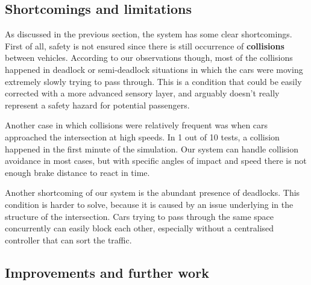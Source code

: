 \iffalse
\begin{itemize}
\item Discuss experimental results. ~
\item Shortcomings of model.
\item Improvements for further tests.
\item traffic fairness - distribution
\end{itemize}
\fi

\subsection{Shortcomings and limitations}
 
As discussed in the previous section, the system has some clear shortcomings.
First of all, safety is not ensured since there is still occurrence of \textbf{collisions} between vehicles.
According to our observations though, most of the collisions happened in deadlock or semi-deadlock situations in which the cars were moving extremely slowly trying to pass through.
This is a condition that could be easily corrected with a more advanced sensory layer, and arguably doesn't really represent a safety hazard for potential passengers.

Another case in which collisions were relatively frequent was when cars approached the intersection at high speeds.
In 1 out of 10 tests, a collision happened in the first minute of the simulation.
Our system can handle collision avoidance in most cases, but with specific angles of impact and speed there is not enough brake distance to react in time.
\newline

Another shortcoming of our system is the abundant presence of deadlocks.
This condition is harder to solve, because it is caused by an issue underlying in the structure of the intersection.
Cars trying to pass through the same space concurrently can easily block each other, especially without a centralised controller that can sort the traffic.

\subsection{Improvements and further work}

